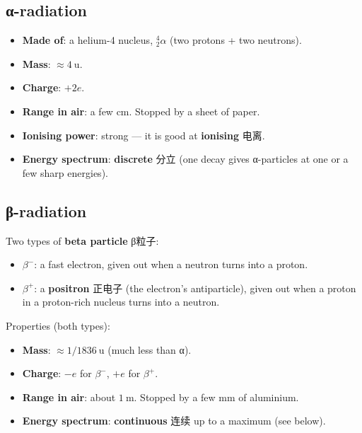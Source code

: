 \documentclass[11pt]{article}
\begin{document}
\subsection*{α-radiation}

\begin{itemize}
\item \textbf{Made of}: a helium-4 nucleus, $^{4}_{2}\alpha$ (two protons + two neutrons).

\item \textbf{Mass}: $\approx 4\ \text{u}$.

\item \textbf{Charge}: $+2e$.

\item \textbf{Range in air}: a few cm. Stopped by a sheet of paper.

\item \textbf{Ionising power}: strong — it is good at \textbf{ionising} 电离.

\item \textbf{Energy spectrum}: \textbf{discrete} 分立 (one decay gives α-particles at one or a few sharp energies).

\end{itemize}

\subsection*{β-radiation}

Two types of \textbf{beta particle} β粒子:

\begin{itemize}
\item $\beta^{-}$: a fast electron, given out when a neutron turns into a proton.

\item $\beta^{+}$: a \textbf{positron} 正电子 (the electron's antiparticle), given out when a proton in a proton-rich nucleus turns into a neutron.

\end{itemize}

Properties (both types):

\begin{itemize}
\item \textbf{Mass}: $\approx 1/1836\ \text{u}$ (much less than α).

\item \textbf{Charge}: $-e$ for $\beta^{-}$, $+e$ for $\beta^{+}$.

\item \textbf{Range in air}: about $1\ \text{m}$. Stopped by a few mm of aluminium.

\item \textbf{Energy spectrum}: \textbf{continuous} 连续 up to a maximum (see below).

\end{itemize}
\end{document}
